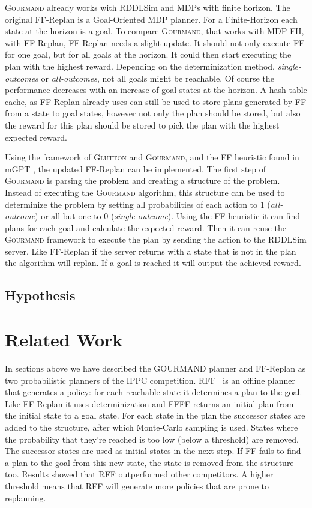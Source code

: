 \documentclass[runningheads,a4paper]{llncs}
\begin{document}
\textsc{Gourmand} already works with RDDLSim and MDPs with finite horizon. The original
FF-Replan is a Goal-Oriented MDP planner. For a Finite-Horizon each state at
the horizon is a goal. To compare \textsc{Gourmand}, that works with MDP-FH, with
FF-Replan, FF-Replan needs a slight update. It should not only execute FF for
one goal, but for all goals at the horizon. It could then start executing the
plan with the highest reward. Depending on the determinization method,
\emph{single-outcomes} or \emph{all-outcomes}, not all goals might be
reachable. Of course the performance decreases with an increase of goal states
at the horizon. A hash-table cache, as FF-Replan already uses can still be used
to store plans generated by FF from a state to goal states, however not only
the plan should be stored, but also the reward for this plan should be stored
to pick the plan with the highest expected reward.

Using the framework of \textsc{Glutton} and \textsc{Gourmand}, and the FF heuristic found in mGPT
\cite{bonet2011mgpt}, the updated FF-Replan can be implemented. The first step
of \textsc{Gourmand} is parsing the problem and creating a structure of the problem.
Instead of executing the \textsc{Gourmand} algorithm, this structure can be used to
determinize the problem by setting all probabilities of each action to 1
(\emph{all-outcome}) or all but one to 0 (\emph{single-outcome}). Using the
FF heuristic it can find plans for each goal and calculate the expected reward.
Then it can reuse the \textsc{Gourmand} framework to execute the plan by sending the
action to the RDDLSim server. Like FF-Replan if the server returns with a state
that is not in the plan the algorithm will replan. If a goal is reached it will
output the achieved reward.

\subsection{Hypothesis}


\section{Related Work}

In sections above we have described the GOURMAND planner and FF-Replan as two
probabilistic planners of the IPPC competition.
RFF~\cite{teichteil2010incremental} is an offline planner that generates a
policy: for each reachable state it determines a plan to the goal. Like
FF-Replan it uses determinization and FF\. FF returns an initial plan from the
initial state to a goal state. For each state in the plan the successor states
are added to the structure, after which Monte-Carlo sampling is used. States
where the probability that they're reached is too low (below a threshold) are
removed. The successor states are used as initial states in the next step. If
FF fails to find a plan to the goal from this new state, the state is removed
from the structure too. Results showed that RFF outperformed other competitors.
A higher threshold means that RFF will generate more policies that are prone to
replanning.
\end{document}
